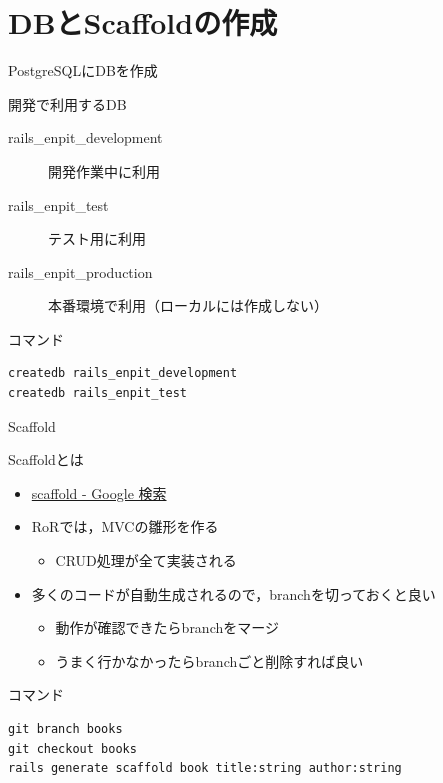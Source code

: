 \documentclass[t, aspectratio=169]{beamer}
\begin{document}
\section{DBとScaffoldの作成}
\label{sec-7-1}
\begin{frame}[fragile,label=sec-7-1-1]{PostgreSQLにDBを作成}
 \begin{block}{開発で利用するDB}
\begin{description}
\item[{rails\_enpit\_development}] 開発作業中に利用
\item[{rails\_enpit\_test}] テスト用に利用
\item[{rails\_enpit\_production}] 本番環境で利用（ローカルには作成しない）
\end{description}
\end{block}

\begin{block}{コマンド}
\begin{verbatim}
createdb rails_enpit_development
createdb rails_enpit_test
\end{verbatim}
\end{block}
\end{frame}
\begin{frame}[fragile,label=sec-7-1-2]{Scaffold}
 \begin{block}{Scaffoldとは}
\begin{itemize}
\item \href{https://www.google.co.jp/search?q=scaffold&client=ubuntu&hs=PiK&channel=fs&hl=ja&source=lnms&tbm=isch&sa=X&ei=smUdVKaZKY7s8AXew4LwDw&ved=0CAgQ_AUoAQ&biw=1195&bih=925}{scaffold - Google 検索}
\item RoRでは，MVCの雛形を作る
\begin{itemize}
\item CRUD処理が全て実装される
\end{itemize}
\item 多くのコードが自動生成されるので，branchを切っておくと良い
\begin{itemize}
\item 動作が確認できたらbranchをマージ
\item うまく行かなかったらbranchごと削除すれば良い
\end{itemize}
\end{itemize}
\end{block}

\begin{block}{コマンド}
\begin{verbatim}
git branch books
git checkout books
rails generate scaffold book title:string author:string
\end{verbatim}
\end{block}
\end{frame}
\end{document}
